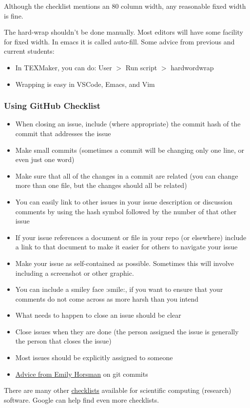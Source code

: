 \documentclass[12pt]{article}
\begin{document}
  Although the checklist mentions an 80 column width, any reasonable fixed width
  is fine.

  The hard-wrap shouldn't be done manually.  Most editors will have
  some facility
  for fixed width.  In emacs it is called auto-fill.  Some advice from previous
  and current students:

  \begin{itemize}
    \item In TEXMaker, you can do: User $>$ Run script $>$ hardwordwrap
    \item Wrapping is easy in VSCode, Emacs, and Vim
  \end{itemize}

  \subsubsection*{Using GitHub Checklist}

  \begin{itemize}
    \item When closing an issue, include (where appropriate) the
      commit hash of the
      commit that addresses the issue
    \item Make small commits (sometimes a commit will be changing
        only one line, or
      even just one word)
    \item Make sure that all of the changes in a commit are related
      (you can change
      more than one file, but the changes should all be related)
    \item You can easily link to other issues in your issue description or
      discussion comments by using the hash symbol followed by the number
      of that other issue
    \item If your issue references a document or file in your repo
      (or elsewhere)
      include a link to that document to make it easier for others to
      navigate your
      issue
    \item Make your issue as self-contained as possible.  Sometimes this will
      involve including a screenshot or other graphic.
    \item You can include a smiley face :smile:, if you want to ensure that your
      comments do not come across as more harsh than you intend
    \item What needs to happen to close an issue should be clear
    \item Close issues when they are done (the person assigned the issue is
      generally the person that closes the issue)
    \item Most issues should be explicitly assigned to someone
    \item
      \href{https://gitlab.cas.mcmaster.ca/smiths/se2aa4_cs2me3/-/blob/master/FAQ/GitAdvice.txt}
      {Advice from Emily Horsman} on git commits
  \end{itemize}

  There are many other
  \href{https://gitlab.cas.mcmaster.ca/SEforSC/se4sc/-/wikis/Advice-and-Checklists-for-Repos-(including-a-list-of-recommended-artifacts)}{checklists}
  available for scientific computing (research) software.  Google can help find
  even more checklists.

  
\end{document}
